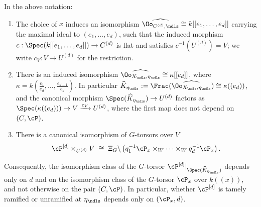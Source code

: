 \begin{lemma}\label{lemma:formal_local_invariance}
    In the above notation:
    \begin{enumerate}
        \item The choice of $x$ induces an isomorphism $\widehat{\Oo_{C^{(d)}, \ndls}} \cong k[[e_1, \dots, e_d]]$ carrying
        the maximal ideal to $(e_1, \dots, e_d)$, such that the induced morphism $c: \Spec(k[[e_1, \dots, e_d]]) \to C^{(d)}$
        is flat and satisfies $c^{-1}(U^{(d)}) = V$; we write $c_V : V \to U^{(d)}$ for the restriction.
        \item There is an induced isomorphism $\widehat{\Oo_{X_\ndls, \eta_\ndls}} \cong \kappa[[e_d]]$, where
        $\kappa = k(\frac{e_1}{e_d}, \dots, \frac{e_{d-1}}{e_d})$. In particular
        $\widehat{K}_{\eta_\ndls} := \Frac(\widehat{\Oo_{X_\ndls, \eta_\ndls}}) \cong \kappa((e_d))$, and the canonical
        morphism $\Spec(\widehat{K}_{\eta_\ndls}) \to U^{(d)}$ factors as
        $\Spec(\kappa((e_d))) \to V \xrightarrow{c_V} U^{(d)}$, where the first map does not depend on $(C, \cP)$.
        \item There is a canonical isomorphism of $G$-torsors over $V$
        $$ \cP^{[d]} \times_{U^{(d)}} V \;\cong\; \Xi_G \backslash \left( q_1^{-1}\cP_x \times_W \cdots \times_W q_d^{-1}\cP_x \right).$$
    \end{enumerate}
    Consequently, the isomorphism class of the $G$-torsor
    $\cP^{[d]}|_{\Spec(\widehat{K}_{\eta_\ndls})}$ depends only on $d$ and on
    the isomorphism class of the $G$-torsor $\cP_x$ over $k((x))$, and not
    otherwise on the pair $(C,\cP)$. In particular, whether $\cP^{[d]}$ is
    tamely ramified or unramified at $\eta_\ndls$ depends only on
    $(\cP_x,d)$.
\end{lemma}

